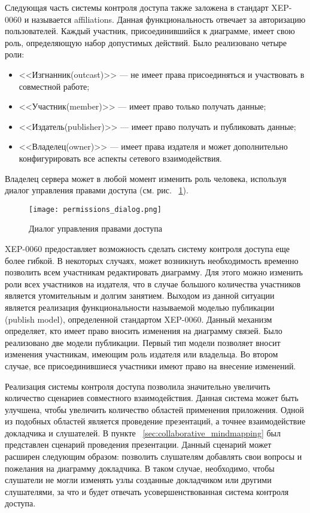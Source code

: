 Следующая часть системы контроля доступа также заложена в стандарт XEP-0060 и
называется affiliations. Данная функциональность отвечает за авторизацию
пользователей. Каждый участник, присоединившийся к диаграмме, имеет свою роль,
определяющую набор допустимых действий. Было реализовано четыре роли:
\begin{itemize}
\item <<Изгнанник(outcast)>> --- не имеет права присоединяться и участвовать в
совместной работе;
\item <<Участник(member)>> --- имеет право только получать данные;
\item <<Издатель(publisher)>> --- имеет право получать и публиковать данные;
\item <<Владелец(owner)>> ---  имеет права издателя и может дополнительно
конфигурировать все аспекты сетевого взаимодействия.
\end{itemize}
Владелец сервера может в любой момент изменить роль человека, используя диалог
управления правами доступа (см. рис. ~\ref{img:permissions_dialog}).

\begin{figure}[b] 
  \centering
  \texttt{[image: permissions\_dialog.png]}
  \caption{Диалог управления правами доступа}
  \label{img:permissions_dialog}
\end{figure}

XEP-0060 предоставляет возможность сделать систему контроля доступа еще более
гибкой. В некоторых случаях, может возникнуть необходимость временно позволить
всем участникам редактировать диаграмму. Для этого можно изменить роли всех
участников на издателя, что в случае большого количества участников является
утомительным и долгим занятием. Выходом из данной ситуации является реализация
функциональности называемой моделью публикации (publish model), определенной
стандартом XEP-0060. Данный механизм определяет, кто имеет право вносить
изменения на диаграмму связей. Было реализовано две модели публикации. Первый
тип модели позволяет вносит изменения участникам, имеющим роль издателя или
владельца. Во втором случае, все присоединившиеся участники имеют право на
внесение изменений.

Реализация системы контроля доступа позволила значительно увеличить количество
сценариев совместного взаимодействия. Данная система может быть улучшена, чтобы
увеличить количество областей применения приложения. Одной из подобных областей
является проведение презентаций, а точнее взаимодействие докладчика и
слушателей. В пункте ~\ref{sec:collaborative_mindmapping} был представлен
сценарий проведения презентации. Данный сценарий может расширен следующим
образом: позволить слушателям добавлять свои вопросы и пожелания на диаграмму
докладчика. В таком случае, необходимо, чтобы слушатели не могли изменять узлы
созданные докладчиком или другими слушателями, за что и будет отвечать
усовершенствованная система контроля доступа.
